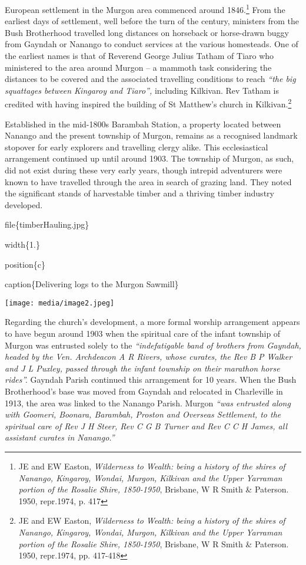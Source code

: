 European settlement in the Murgon area commenced around 1846.\footnote{JE and EW Easton, \emph{Wilderness to Wealth: being a history of the shires of Nanango, Kingaroy, Wondai, Murgon, Kilkivan and the Upper Yarraman portion of the Rosalie Shire, 1850-1950}, Brisbane, W R Smith \& Paterson. 1950, repr.1974, p. 417} From the earliest days of settlement, well before the turn of the century, ministers from the Bush Brotherhood travelled long distances on horseback or horse-drawn buggy from Gayndah or Nanango to conduct services at the various homesteads. One of the earliest names is that of Reverend George Julius Tatham of Tiaro who ministered to the area around Murgon -- a mammoth task considering the distances to be covered and the associated travelling conditions to reach \emph{``the big squattages between Kingaroy and Tiaro'',} including Kilkivan. Rev Tatham is credited with having inspired the building of St Matthew's church in Kilkivan.\footnote{JE and EW Easton, \emph{Wilderness to Wealth: being a history of the shires of Nanango, Kingaroy, Wondai, Murgon, Kilkivan and the Upper Yarraman portion of the Rosalie Shire, 1850-1950}, Brisbane, W R Smith \& Paterson. 1950, repr.1974, pp. 417-418}

Established in the mid-1800s Barambah Station, a property located between Nanango and the present township of Murgon, remains as a recognised landmark stopover for early explorers and travelling clergy alike. This ecclesiastical arrangement continued up until around 1903. The township of Murgon, as such, did not exist during these very early years, though intrepid adventurers were known to have travelled through the area in search of grazing land. They noted the significant stands of harvestable timber and a thriving timber industry developed.

file\{timberHauling.jpg\}

width\{1.\}

position\{c\}

caption\{Delivering logs to the Murgon Sawmill\}

\texttt{[image: media/image2.jpeg]}

Regarding the church's development, a more formal worship arrangement appears to have begun around 1903 when the spiritual care of the infant township of Murgon was entrusted solely to the \emph{``indefatigable band of brothers from Gayndah, headed by the Ven. Archdeacon A R Rivers, whose curates, the Rev B P Walker and J L Puxley, passed through the infant township on their marathon horse rides''.} Gayndah Parish continued this arrangement for 10 years. When the Bush Brotherhood's base was moved from Gayndah and relocated in Charleville in 1913, the area was linked to the Nanango Parish. Murgon \emph{``was entrusted along with Goomeri, Boonara, Barambah, Proston and Overseas Settlement, to the spiritual care of Rev J H Steer, Rev C G B Turner and Rev C C H James, all assistant curates in Nanango.''}

